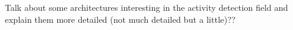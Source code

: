 
Talk about some architectures interesting in the activity detection field and explain them more detailed (not much detailed but a little)??



